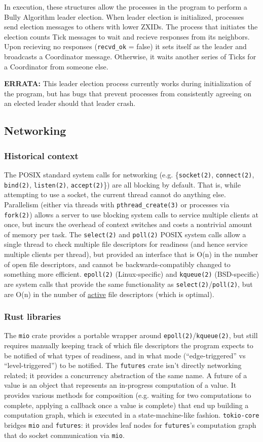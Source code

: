 \documentclass{article}
\begin{document}
	In execution, these structures allow the processes in the program to perform a Bully Algorithm leader election. When leader election is initialized, processes send election messages to others with lower ZXIDs. The process that initiates the election counts Tick messages to wait and recieve responses from its neighbors. Upon recieving no responses (\verb|recvd_ok| = false) it sets itself as the leader and broadcasts a Coordinator message. Otherwise, it waits another series of Ticks for a Coordinator from someone else. 

	\textbf{ERRATA:} This leader election process currently works during initialization of the program, but has bugs that prevent processes from consistently agreeing on an elected leader should that leader crash. 


\subsection*{Networking}
\subsubsection*{Historical context}
The POSIX standard system calls for networking (e.g. \{\verb|socket(2)|, \verb|connect(2)|, \verb|bind(2)|, \verb|listen(2)|, \verb|accept(2)|\}) are all blocking by default.
That is, while attempting to use a socket, the current thread cannot do anything else.
Parallelism (either via threads with \verb|pthread_create(3)| or processes via \verb|fork(2)|) allows a server to use blocking system calls to service multiple clients at once, but incurs the overhead of context switches and costs a nontrivial amount of memory per task.
The \verb|select(2)| and \verb|poll(2)| POSIX system calls allow a single thread to check multiple file descriptors for readiness (and hence service multiple clients per thread), but provided an interface that is O(n) in the number of open file descriptors, and cannot be backwards-compatibly changed to something more efficient.
\verb|epoll(2)| (Linux-specific) and \verb|kqueue(2)| (BSD-specific) are system calls that provide the same functionality as \verb|select(2)|/\verb|poll(2)|, but are O(n) in the number of \underline{active} file descriptors (which is optimal).
\subsubsection*{Rust libraries}
The \verb|mio| crate provides a portable wrapper around \verb|epoll(2)|/\verb|kqueue(2)|, but still requires manually keeping track of which file descriptors the program expects to be notified of what types of readiness, and in what mode (``edge-triggered'' vs ``level-triggered'') to be notified.
The \verb|futures| crate isn't directly networking related; it provides a concurrency abstraction of the same name.
A future of a value is an object that represents an in-progress computation of a value.
It provides various methods for composition (e.g. waiting for two computations to complete, applying a callback once a value is complete) that end up building a computation graph, which is executed in a state-machine-like fashion.
\verb|tokio-core| bridges \verb|mio| and \verb|futures|: it provides leaf nodes for \verb|futures|'s computation graph that do socket communication via \verb|mio|.
\end{document}
